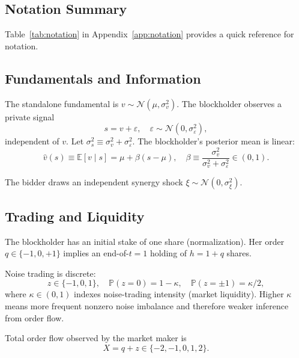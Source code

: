 \documentclass[11pt]{article}
\newcommand{\E}{\mathbb{E}}
\newcommand{\PP}{\mathbb{P}}
\newcommand{\1}{\mathbf{1}}
\begin{document}
\subsection{Notation Summary}

Table~\ref{tab:notation} in Appendix~\ref{app:notation} provides a quick reference for notation.

\subsection{Fundamentals and Information}

The standalone fundamental is $v \sim \mathcal{N}(\mu, \sigma_v^2)$. The blockholder observes a private signal
\[
s = v + \varepsilon, \quad \varepsilon \sim \mathcal{N}(0, \sigma_\varepsilon^2),
\]
independent of $v$. Let $\sigma_s^2 \equiv \sigma_v^2 + \sigma_\varepsilon^2$. The blockholder's posterior mean is linear:
\[
\hat{v}(s) \equiv \E[v \mid s] = \mu + \beta(s - \mu), \quad \beta \equiv \frac{\sigma_v^2}{\sigma_v^2 + \sigma_\varepsilon^2} \in (0,1).
\]

The bidder draws an independent synergy shock $\xi \sim \mathcal{N}(0, \sigma_\xi^2)$.

\subsection{Trading and Liquidity}

The blockholder has an initial stake of one share (normalization). Her order $q \in \{-1, 0, +1\}$ implies an end-of-$t=1$ holding of $h = 1 + q$ shares.

Noise trading is discrete:
\[
z \in \{-1, 0, 1\}, \quad \PP(z = 0) = 1 - \kappa, \quad \PP(z = \pm 1) = \kappa/2,
\]
where $\kappa \in (0, 1)$ indexes noise-trading intensity (market liquidity). Higher $\kappa$ means more frequent nonzero noise imbalance and therefore weaker inference from order flow.

Total order flow observed by the market maker is
\[
X = q + z \in \{-2, -1, 0, 1, 2\}.
\]
\end{document}
